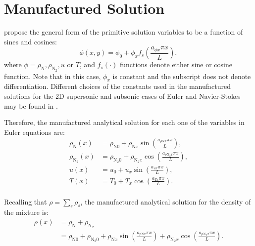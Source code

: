 \documentclass[10pt]{article}
\begin{document}
\section{Manufactured Solution}

\citet{Roy2002} propose the general form of the primitive solution variables to be a function of sines and cosines:
\begin{equation}
 \label{eq:manufactured01}
 \phi (x,y) = \phi_0+ \phi_x f_s\left(\frac{a_{\phi x} \pi x}{L}\right) ,
\end{equation}
where $\phi=\rho_{\text{N}},\rho_{\text{N}_2}, u$ or $T$, and $f_s(\cdot)$ functions denote either sine or cosine function. Note that in this case, $\phi_x$ is constant and the subscript does not denote differentiation. Different choices of the constants used in the manufactured solutions for the 2D supersonic and subsonic cases of Euler and Navier-Stokes may be found in \citet{Roy2002}.

Therefore, the manufactured analytical solution for each one of the variables in Euler equations are:
\begin{equation}
\begin{split}
\label{eq:manufactured02}
\rho_{\text{N}}(x) &= \rho_{\text{N}0} + \rho_{\text{N}x} \sin\left(\frac{a_{  \rho \text{N} x }\pi x}{L}\right),\\
\rho_{\text{N}_2}(x) &= \rho_{\text{N}_2 0}+ \rho_{\text{N}_2 x} \cos\left(\frac{a_{ \rho \text{N}_2 x } \pi x}{L}\right),\\
u(x) &= u_{0}+u_{x} \sin\left(\frac{a_{u x} \pi x}{L}\right),\\
T(x) &= T_{0}+T_{x} \cos\left(\frac{a_{T x} \pi x}{L}\right).\\
\end{split}
\end{equation}

Recalling that $\rho=\sum_s \rho_s$, the manufactured analytical solution for the density of the mixture  is:
\begin{equation}
\label{eq:manufactured03}
\begin{split}
\rho(x) &= \rho_{\text{N}}+\rho_{\text{N}_2}\\
                     &= \rho_{\text{N}0} + \rho_{\text{N}_2 0} +
\rho_{\text{N}x} \sin\left(\frac{a_{  \rho \text{N} x }\pi x}{L}\right) + \rho_{\text{N}_2 x} \cos\left(\frac{a_{ \rho \text{N}_2 x } \pi x}{L}\right) .
\end{split}
\end{equation}
\end{document}
